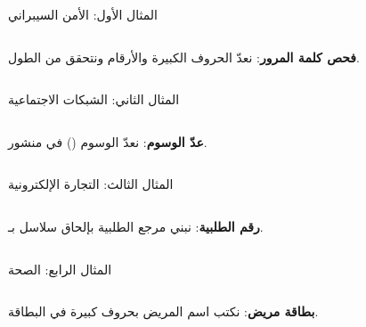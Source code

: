 \documentclass[aspectratio=169, 11pt, t, xcolor={table}]{beamer}
\begin{document}
\begin{frame}[t]{المثال الأول: الأمن السيبراني}
    \begin{columns}[T]
        {\small \textbf{فحص كلمة المرور}: نعدّ الحروف الكبيرة والأرقام ونتحقق من الطول.\par}
        \vspace{0.3cm}
    \end{columns}
\end{frame}

\begin{frame}[t]{المثال الثاني: الشبكات الاجتماعية}
    \begin{columns}[T]
        {\small \textbf{عدّ الوسوم}: نعدّ الوسوم (\code{\#}) في منشور.\par}
        \vspace{0.3cm}
    \end{columns}
\end{frame}

\begin{frame}[t]{المثال الثالث: التجارة الإلكترونية}
    \begin{columns}[T]
        {\small \textbf{رقم الطلبية}: نبني مرجع الطلبية بإلحاق سلاسل بـ.\par}
        \vspace{0.3cm}
    \end{columns}
\end{frame}

\begin{frame}[t]{المثال الرابع: الصحة}
    \begin{columns}[T]
        {\small \textbf{بطاقة مريض}: نكتب اسم المريض بحروف كبيرة في البطاقة.\par}
        \vspace{0.3cm}
    \end{columns}
\end{frame}
\end{document}
